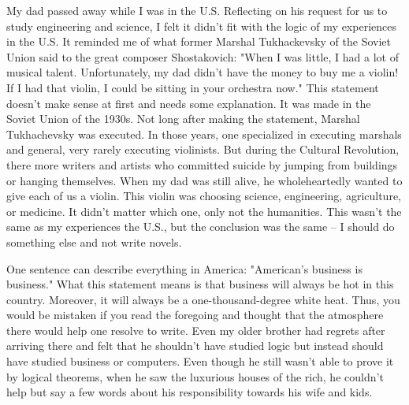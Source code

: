 My dad passed away while I was in the U.S. Reflecting on his request for us to study engineering and science, I felt it didn't fit with the logic of my experiences in the U.S. It reminded me of what former Marshal Tukhackevsky of the Soviet Union said to the great composer Shostakovich: "When I was little, I had a lot of musical talent. Unfortunately, my dad didn't have the money to buy me a violin! If I had that violin, I could be sitting in your orchestra now." This statement doesn't make sense at first and needs some explanation. It was made in the Soviet Union of the 1930s. Not long after making the statement, Marshal Tukhachevsky was executed. In those years, one specialized in executing marshals and general, very rarely executing violinists. But during the Cultural Revolution, there more writers and artists who committed suicide by jumping from buildings or hanging themselves. When my dad was still alive, he wholeheartedly wanted to give each of us a violin. This violin was choosing science, engineering, agriculture, or medicine. It didn't matter which one, only not the humanities. This wasn't the same as my experiences the U.S., but the conclusion was the same -- I should do something else and not write novels. 

One sentence can describe everything in America: "American's business is business." What this statement means is that business will always be hot in this country. Moreover, it will always be a one-thousand-degree white heat. Thus, you would be mistaken if you read the foregoing and thought that the atmosphere there would help one resolve to write. Even my older brother had regrets after arriving there and felt that he shouldn't have studied logic but instead should have studied business or computers. Even though he still wasn't able to prove it by logical theorems, when he saw the luxurious houses of the rich, he couldn't help but say a few words about his responsibility towards his wife and kids. 

